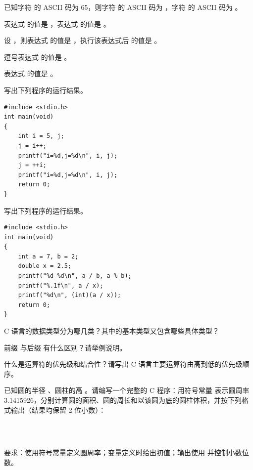 \documentclass[a4paper,11pt]{article}
\begin{document}
\q 已知字符  的 ASCII 码为 65，则字符  的 ASCII 码为 \fillblank{}，字符  的 ASCII 码为 \fillblank{}。

\q 表达式  的值是 \fillblank{}，表达式  的值是 \fillblank{}。

\q 设 ，则表达式  的值是 \fillblank{}，执行该表达式后  的值是 \fillblank{}。

\q 逗号表达式  的值是 \fillblank{}。

\q 表达式  的值是 \fillblank{}。


\q 写出下列程序的运行结果。
\begin{lstlisting}[language={[custom]C}]
#include <stdio.h>
int main(void)
{
    int i = 5, j;
    j = i++;
    printf("i=%d,j=%d\n", i, j);
    j = ++i;
    printf("i=%d,j=%d\n", i, j);
    return 0;
}
\end{lstlisting}
\anslines{2.4cm}

\q 写出下列程序的运行结果。
\begin{lstlisting}[language={[custom]C}]
#include <stdio.h>
int main(void)
{
    int a = 7, b = 2;
    double x = 2.5;
    printf("%d %d\n", a / b, a % b);
    printf("%.1f\n", a / x);
    printf("%d\n", (int)(a / x));
    return 0;
}
\end{lstlisting}
\anslines{2.4cm}


\q C 语言的数据类型分为哪几类？其中的基本类型又包含哪些具体类型？\anslines{3.0cm}

\q 前缀 \code{++} 与后缀 \code{++} 有什么区别？请举例说明。\anslines{3.0cm}

\q 什么是运算符的优先级和结合性？请写出 C 语言主要运算符由高到低的优先级顺序。\anslines{3.4cm}

\newpage
{}

\q 已知圆的半径 、圆柱的高 。请编写一个完整的 C 程序：用符号常量  表示圆周率 3.1415926，分别计算圆的面积、圆的周长和以该圆为底的圆柱体积，并按下列格式输出（结果均保留 2 位小数）：
\par\vspace{0.15em}
\noindent\hspace{2em}\\
\noindent\hspace{2em}\\
\noindent\hspace{2em}

\noindent 要求：使用符号常量定义圆周率；变量定义时给出初值；输出使用  并控制小数位数。\anslines{4.0cm}
\end{document}
